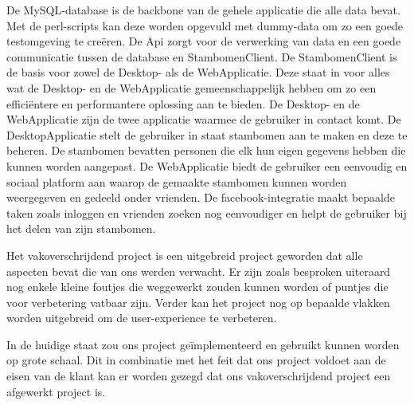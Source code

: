 \documentclass[pdftex,a4paper,12pt,twoside]{report}
\begin{document}
De MySQL-database is de backbone van de gehele applicatie die alle data bevat. Met de perl-scripts kan deze worden opgevuld met dummy-data om zo een goede testomgeving te creëren. De Api zorgt voor de verwerking van data en een goede communicatie tussen de database en StambomenClient. De StambomenClient is de basis voor zowel de Desktop- als de WebApplicatie. Deze staat in voor alles wat de Desktop- en de WebApplicatie gemeenschappelijk hebben om zo een efficiëntere en performantere oplossing aan te bieden. De Desktop- en de WebApplicatie zijn de twee applicatie waarmee de gebruiker in contact komt. De DesktopApplicatie stelt de gebruiker in staat stambomen aan te maken en deze te beheren. De stambomen bevatten personen die elk hun eigen gegevens hebben die kunnen worden aangepast. De WebApplicatie biedt de gebruiker een eenvoudig en sociaal platform aan waarop de gemaakte stambomen kunnen worden weergegeven en gedeeld onder vrienden. De facebook-integratie maakt bepaalde taken zoals inloggen en vrienden zoeken nog eenvoudiger en helpt de gebruiker bij het delen van zijn stambomen.

Het vakoverschrijdend project is een uitgebreid project geworden dat alle aspecten bevat die van ons werden verwacht. Er zijn zoals besproken uiteraard nog enkele kleine foutjes die weggewerkt zouden kunnen worden of puntjes die voor verbetering vatbaar zijn. Verder kan het project nog op bepaalde vlakken worden uitgebreid om de user-experience te verbeteren.

In de huidige staat zou ons project geïmplementeerd en gebruikt kunnen worden op grote schaal. Dit in combinatie met het feit dat ons project voldoet aan de eisen van de klant kan er worden gezegd dat ons vakoverschrijdend project een afgewerkt project is.



\end{document}
